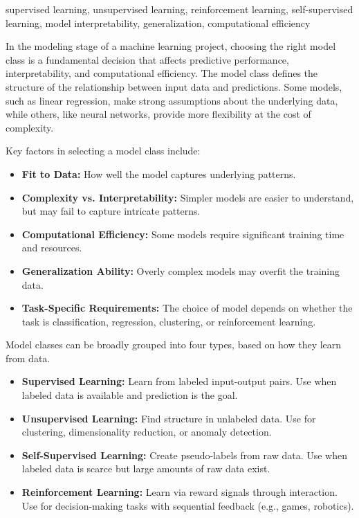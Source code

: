 \documentclass[12pt,openany, draft]{book}
\begin{document}
\begin{keywordsbox}
supervised learning, unsupervised learning, reinforcement learning, self-supervised learning, model interpretability, generalization, computational efficiency
\end{keywordsbox}


In the modeling stage of a machine learning project, choosing the right model class is a fundamental decision that affects predictive performance, interpretability, and computational efficiency. The model class defines the structure of the relationship between input data and predictions. Some models, such as linear regression, make strong assumptions about the underlying data, while others, like neural networks, provide more flexibility at the cost of complexity.
\newline

Key factors in selecting a model class include:
\begin{itemize}
    \item \textbf{Fit to Data:} How well the model captures underlying patterns.
    \item \textbf{Complexity vs. Interpretability:} Simpler models are easier to understand, but may fail to capture intricate patterns.
    \item \textbf{Computational Efficiency:} Some models require significant training time and resources.
    \item \textbf{Generalization Ability:} Overly complex models may overfit the training data.
    \item \textbf{Task-Specific Requirements:} The choice of model depends on whether the task is classification, regression, clustering, or reinforcement learning.
\end{itemize}

Model classes can be broadly grouped into four types, based on how they learn from data.

\begin{itemize}
    \item \textbf{Supervised Learning:} Learn from labeled input-output pairs. Use when labeled data is available and prediction is the goal.
    \item \textbf{Unsupervised Learning:} Find structure in unlabeled data. Use for clustering, dimensionality reduction, or anomaly detection.
    \item \textbf{Self-Supervised Learning:} Create pseudo-labels from raw data. Use when labeled data is scarce but large amounts of raw data exist.
    \item \textbf{Reinforcement Learning:} Learn via reward signals through interaction. Use for decision-making tasks with sequential feedback (e.g., games, robotics).
\end{itemize}
\end{document}
